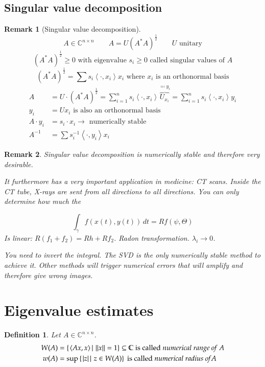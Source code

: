 \documentclass[a4paper]{article}
\newcounter{lecref}[section]
\numberwithin{lecref}{section}
\newtheorem{definition}[lecref]{Definition}
\newtheorem*{Remark}{Remark}
\newcommand{\setdef}[2]{\left\{\left.#1\,\right|\,#2\right\}}
\newcommand{\angel}[1]{\left\langle#1\right\rangle}
\newcommand{\norm}[1]{\left\|#1\right\|}
\newcommand{\card}[1]{\left|#1\right|}
\begin{document}
\subsection{Singular value decomposition}

\begin{Remark}[Singular value decomposition]
  \[ A \in \mathbb C^{n \times n} \qquad A = U (A^* A)^{\frac12} \qquad U \text{ unitary} \]
  \[ (A^* A)^{\frac12} \geq 0 \text{ with eigenvalue } s_i \geq 0 \text{ called singular values of } A \]
  \[ (A^* A)^{\frac12} = \sum s_i \angel{\cdot, x_i} x_i \text{ where } x_i \text{ is an orthonormal basis} \]
  \begin{align*}
    A &= U \cdot (A^* A)^{\frac12}
      = \sum_{i=1}^n s_i \angel{\cdot, x_i} \overbrace{U_{x_i}}^{\eqqcolon y_i}
      = \sum_{i=1}^n s_i \angel{\cdot, x_i} y_i \\
    y_i &= U x_i \text{ is also an orthonormal basis} \\
    A \cdot y_i &= s_i \cdot x_i \to \text{ numerically stable} \\
    A^{-1} &= \sum s^{-1}_i \angel{\cdot, y_i} x_i
  \end{align*}
\end{Remark}

\begin{Remark}
  Singular value decomposition is numerically stable and therefore very desirable.

  It furthermore has a very important application in medicine: CT scans.
  Inside the CT tube, X-rays are sent from all directions to all directions.
  You can only determine how much the 

  \[ \int_{\gamma} f(x(t), y(t)) \,dt = Rf(\psi, \Theta) \]
  Is linear: $R(f_1 + f_2) = Rh + Rf_2$.
  Radon transformation. $\lambda_i \to 0$.

  You need to invert the integral. The SVD is the only numerically stable method to achieve it. Other methods will trigger numerical errors that will amplify and therefore give wrong images.
\end{Remark}

\section{Eigenvalue estimates} %

\begin{definition} %
  Let $A \in \mathbb C^{n \times n}$.
  \begin{align*}
    W(A) &= \setdef{\angel{Ax, x}}{\norm{x} = 1} \subseteq \mathbb C \text{ is called \emph{numerical range of }} A \\
    w(A) &= \sup\setdef{\card{z}}{z \in W(A)} \text{ is called \emph{numerical radius of}} A
  \end{align*}
\end{definition}
\end{document}
